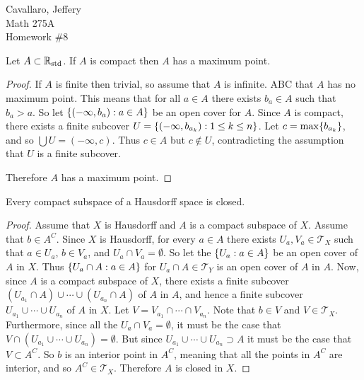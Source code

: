 \documentclass[letterpaper,12pt,fleqn]{article}
\newcommand{\Rs}{\R_{\text{std}}}
\newcommand{\T}{\mathscr{T}}
\begin{document}
Cavallaro, Jeffery \\
Math 275A \\
Homework \#8

\bigskip

\begin{theorem}[6.2]
  Let \(A\subset\Rs\).  If \(A\) is compact then \(A\) has a maximum point.
\end{theorem}

\begin{proof}
  If \(A\) is finite then trivial, so assume that \(A\) is infinite.  ABC that \(A\) has no maximum point.  This
  means that for all \(a\in A\) there exists \(b_a\in A\) such that \(b_a>a\).  So let \(\{(-\infty,b_a):a\in A\}\)
  be an open cover for \(A\).  Since \(A\) is compact, there exists a finite subcover
  \(U=\{(-\infty,b_{a_k}):1\le k\le n\}\).  Let \(c=\max\{b_{a_k}\}\), and so \(\bigcup U=(-\infty,c)\).  Thus
  \(c\in A\) but \(c\notin U\), contradicting the assumption that \(U\) is a finite subcover.

  Therefore \(A\) has a maximum point.
\end{proof}

\begin{theorem}[6.9]
  Every compact subspace of a Hausdorff space is closed.
\end{theorem}

\begin{proof}
  Assume that \(X\) is Hausdorff and \(A\) is a compact subspace of \(X\).  Assume that \(b\in A^C\).  Since \(X\)
  is Hausdorff, for every \(a\in A\) there exists \(U_a,V_a\in\T_X\) such that \(a\in U_a\), \(b\in V_a\), and
  \(U_a\cap V_a=\emptyset\).  So let the \(\{U_a:a\in A\}\) be an open cover of \(A\) in \(X\).  Thus
  \(\{U_a\cap A:a\in A\}\) for \(U_a\cap A\in\T_Y\) is an open cover of \(A\) in \(A\).  Now, since \(A\) is a
  compact subspace of \(X\), there exists a finite subcover \((U_{a_1}\cap A)\cup\cdots\cup(U_{a_n}\cap A)\) of
  \(A\) in \(A\), and hence a finite subcover \(U_{a_1}\cup\cdots\cup U_{a_n}\) of \(A\) in \(X\).  Let
  \(V=V_{a_1}\cap\cdots\cap V_{a_n}\).  Note that \(b\in V\) and \(V\in\T_X\).  Furthermore, since all the
  \(U_a\cap V_a=\emptyset\), it must be the case that \(V\cap(U_{a_1}\cup\cdots\cup U_{a_n})=\emptyset\).  But
  since \(U_{a_1}\cup\cdots\cup U_{a_n}\supset A\) it must be the case that \(V\subset A^C\).  So \(b\) is an
  interior point in \(A^C\), meaning that all the points in \(A^C\) are interior, and so \(A^C\in\T_X\).  Therefore
  \(A\) is closed in \(X\).
\end{proof}
\end{document}
